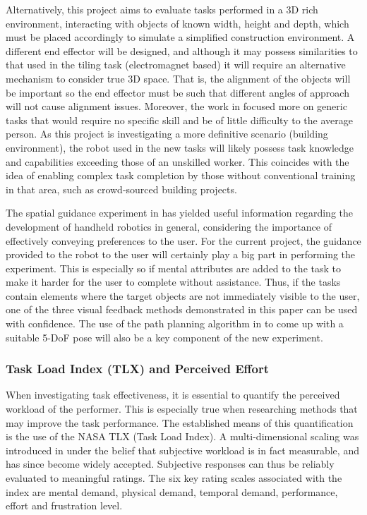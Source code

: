 \documentclass[11pt]{article}
\begin{document}
Alternatively, this project aims to evaluate tasks performed in a 3D rich environment, interacting with objects of known width, height and depth, which must be placed accordingly to simulate a simplified construction environment. A different end effector will be designed, and although it may possess similarities to that used in the tiling task (electromagnet based) it will require an alternative mechanism to consider true 3D space. That is, the alignment of the objects will be important so the end effector must be such that different angles of approach will not cause alignment issues. Moreover, the work in \cite{GreggSmithDesign} focused more on generic tasks that would require no specific skill and be of little difficulty to the average person. As this project is investigating a more definitive scenario (building environment), the robot used in the new tasks will likely possess task knowledge and capabilities exceeding those of an unskilled worker. This coincides with the idea of enabling complex task completion by those without conventional training in that area, such as crowd-sourced building projects.

The spatial guidance experiment in \cite{GreggSmithFeedback} has yielded useful information regarding the development of handheld robotics in general, considering the importance of effectively conveying preferences to the user. For the current project, the guidance provided to the robot to the user will certainly play a big part in performing the experiment. This is especially so if mental attributes are added to the task to make it harder for the user to complete without assistance. Thus, if the tasks contain elements where the target objects are not immediately visible to the user, one of the three visual feedback methods demonstrated in this paper can be used with confidence. The use of the path planning algorithm in \cite{GreggSmithFeedback} to come up with a suitable 5-DoF pose will also be a key component of the new experiment.


\subsubsection{Task Load Index (TLX) and Perceived Effort}

When investigating task effectiveness, it is essential to quantify the perceived workload of the performer. This is especially true when researching methods that may improve the task performance. The established means of this quantification is the use of the NASA TLX (Task Load Index). A multi-dimensional scaling was introduced in \cite{hart1988} under the belief that subjective workload is in fact measurable, and has since become widely accepted. Subjective responses can thus be reliably evaluated to meaningful ratings. The six key rating scales associated with the index are mental demand, physical demand, temporal demand, performance, effort and frustration level. 
\end{document}

